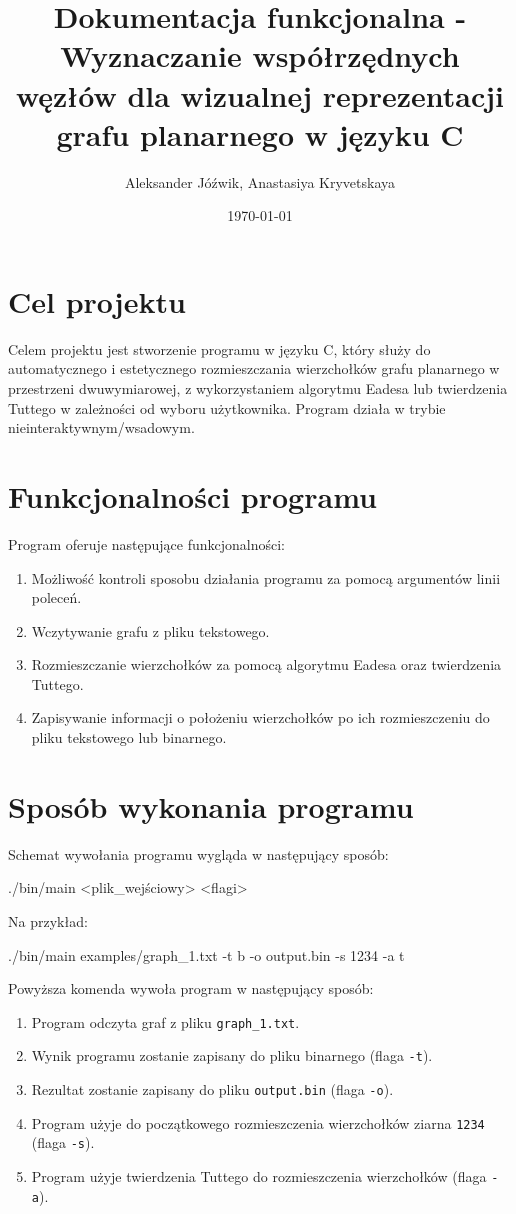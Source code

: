 \documentclass[]{article}
\title{Dokumentacja funkcjonalna - Wyznaczanie współrzędnych węzłów dla wizualnej reprezentacji grafu planarnego w języku C}
\author{\authoricon Aleksander Jóźwik, Anastasiya Kryvetskaya}
\date{\dateicon \today}
\begin{document}
	\noindent
	\maketitle

	\tableofcontents
	\clearpage

	\section{Cel projektu}
	Celem projektu jest stworzenie programu w języku C, który służy do automatycznego i estetycznego rozmieszczania
	wierzchołków grafu planarnego w przestrzeni dwuwymiarowej, z wykorzystaniem algorytmu Eadesa lub twierdzenia 
	Tuttego w zależności od wyboru użytkownika. Program działa w trybie nieinteraktywnym/wsadowym.
	\section{Funkcjonalności programu}
	Program oferuje następujące funkcjonalności:
	\begin{enumerate}
		\item Możliwość kontroli sposobu działania programu za pomocą argumentów linii poleceń.
		\item Wczytywanie grafu z pliku tekstowego.
		\item Rozmieszczanie wierzchołków za pomocą algorytmu Eadesa oraz twierdzenia Tuttego.
		\item Zapisywanie informacji o położeniu wierzchołków po ich rozmieszczeniu do pliku tekstowego lub binarnego.
		
	\end{enumerate}
	
	\section{Sposób wykonania programu}
	Schemat wywołania programu wygląda w następujący sposób:
	\begin{mylisting}
./bin/main <plik_wejściowy> <flagi>
	\end{mylisting}
	Na przykład:
	\begin{mylisting}
./bin/main examples/graph_1.txt -t b -o output.bin -s 1234 -a t
	\end{mylisting}
	Powyższa komenda wywoła program w następujący sposób:
	\begin{enumerate}
		\item Program odczyta graf z pliku \texttt{graph\_1.txt}.
		\item Wynik programu zostanie zapisany do pliku binarnego (flaga \texttt{-t}).
		\item Rezultat zostanie zapisany do pliku \texttt{output.bin} (flaga \texttt{-o}).
		\item Program użyje do początkowego rozmieszczenia wierzchołków ziarna \texttt{1234} (flaga \texttt{-s}).
		\item Program użyje twierdzenia Tuttego do rozmieszczenia wierzchołków (flaga \texttt{-a}).
	\end{enumerate}
\end{document}
